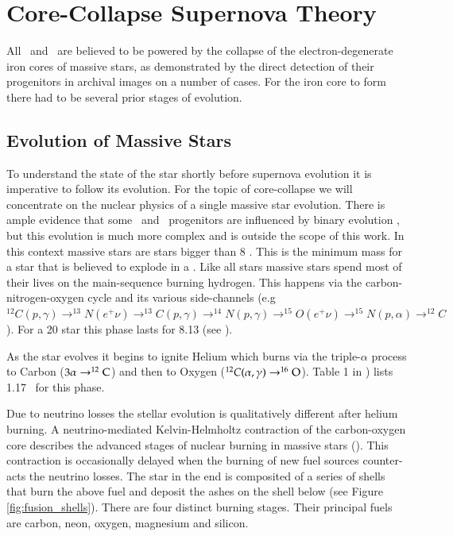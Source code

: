 \newpage
\section{Core-Collapse Supernova Theory}

All \snii\ and \snibc\ are believed to be powered by the collapse of the electron-degenerate iron cores of massive stars, as demonstrated by the direct detection of their progenitors in archival images on a number of cases. For the iron core to form there had to be several prior stages of evolution.

\subsection{Evolution of Massive Stars}  To understand the state of the star shortly before supernova evolution it is imperative to follow its evolution. For the topic of core-collapse we will concentrate on the nuclear physics of a single massive star evolution. There is ample evidence that some \snii\ and \snibc\ progenitors are influenced by binary evolution \citep{1992ApJ...391..246P}, but this evolution is much more complex and is outside the scope of this work.  In this context massive stars are stars bigger than 8 \msun. This is the minimum mass for a star that is believed to explode in a \snii. Like all stars massive stars spend most of their lives on the main-sequence burning hydrogen. This happens via the carbon-nitrogen-oxygen cycle and its various side-channels (e.g $^{12}C(p,\gamma)\rightarrow^{13}N(e^+\nu)\rightarrow^{13}C(p,\gamma)\rightarrow^{14}N(p,\gamma)\rightarrow^{15}O(e^+\nu)\rightarrow^{15}N(p,\alpha)\rightarrow^{12}C$). For a 20 \msun star this phase lasts for 8.13 \myr (see \citet{2002RvMP...74.1015W}).

As the star evolves it begins to ignite Helium which burns via the triple-$\alpha$ process to Carbon ($3\alpha\rightarrow^{12}\textrm{C}$) and then to Oxygen ($^{12}C(\alpha,\gamma)\rightarrow^{16}\textrm{O}$). Table 1 in \citet{2002RvMP...74.1015W}) lists 1.17 \myr\ for this phase. 

Due to neutrino losses the stellar evolution is qualitatively different after helium burning. A neutrino-mediated Kelvin-Helmholtz contraction of the carbon-oxygen core describes the advanced stages of nuclear burning in massive stars (\citet{2002RvMP...74.1015W}). This contraction is occasionally delayed when the burning of new fuel sources counter-acts the neutrino losses. The star in the end is composited of a series of shells that burn the above fuel and deposit the ashes on the shell below (see Figure \ref{fig:fusion_shells}). There are four distinct burning stages. Their principal fuels are carbon, neon, oxygen, magnesium and silicon.

